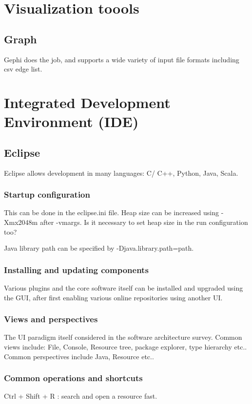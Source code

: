 \documentclass[oneside, article]{memoir}
\begin{document}
\chapter{Visualization toools}
\section{Graph}
Gephi does the job, and supports a wide variety of input file formats including csv edge list.

\chapter{Integrated Development Environment (IDE)}
\section{Eclipse}
Eclipse allows development in many languages: C/ C++, Python, Java, Scala.

\subsection{Startup configuration}
This can be done in the eclipse.ini file. Heap size can be increased using -Xmx2048m after -vmargs. \chk Is it necessary to set heap size in the run configuration too?

Java library path can be specified by -Djava.library.path=path.

\subsection{Installing and updating components}
Various plugins and the core software itself can be installed and upgraded using the GUI, after first enabling various online repositories using another UI.

\subsection{Views and perspectives}
The UI paradigm itself considered in the software architecture survey. Common views include: File, Console, Resource tree, package explorer, type hierarchy etc.. Common perspectives include Java, Resource etc..

\subsection{Common operations and shortcuts}
Ctrl + Shift + R : search and open a resource fast.
\end{document}
